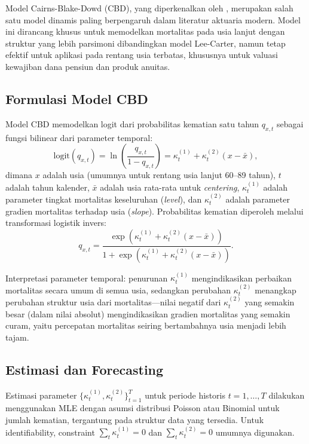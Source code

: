 Model Cairns-Blake-Dowd (CBD), yang diperkenalkan oleh \citet{cairns2006two}, merupakan salah satu model dinamis paling berpengaruh dalam literatur aktuaria modern. Model ini dirancang khusus untuk memodelkan mortalitas pada usia lanjut dengan struktur yang lebih parsimoni dibandingkan model Lee-Carter, namun tetap efektif untuk aplikasi pada rentang usia terbatas, khususnya untuk valuasi kewajiban dana pensiun dan produk anuitas.

\subsection{Formulasi Model CBD}

Model CBD memodelkan logit dari probabilitas kematian satu tahun $q_{x,t}$ sebagai fungsi bilinear dari parameter temporal:
\begin{equation}
\text{logit}(q_{x,t}) = \ln\left(\frac{q_{x,t}}{1-q_{x,t}}\right) = \kappa_t^{(1)} + \kappa_t^{(2)} (x - \bar{x}),
\label{eq:cbd_basic}
\end{equation}
dimana $x$ adalah usia (umumnya untuk rentang usia lanjut 60--89 tahun), $t$ adalah tahun kalender, $\bar{x}$ adalah usia rata-rata untuk \textit{centering}, $\kappa_t^{(1)}$ adalah parameter tingkat mortalitas keseluruhan (\textit{level}), dan $\kappa_t^{(2)}$ adalah parameter gradien mortalitas terhadap usia (\textit{slope}). Probabilitas kematian diperoleh melalui transformasi logistik invers:
\begin{equation}
q_{x,t} = \frac{\exp(\kappa_t^{(1)} + \kappa_t^{(2)} (x - \bar{x}))}{1 + \exp(\kappa_t^{(1)} + \kappa_t^{(2)} (x - \bar{x}))}.
\label{eq:cbd_qx}
\end{equation}

Interpretasi parameter temporal: penurunan $\kappa_t^{(1)}$ mengindikasikan perbaikan mortalitas secara umum di semua usia, sedangkan perubahan $\kappa_t^{(2)}$ menangkap perubahan struktur usia dari mortalitas—nilai negatif dari $\kappa_t^{(2)}$ yang semakin besar (dalam nilai absolut) mengindikasikan gradien mortalitas yang semakin curam, yaitu percepatan mortalitas seiring bertambahnya usia menjadi lebih tajam.

\subsection{Estimasi dan Forecasting}

Estimasi parameter $\{\kappa_t^{(1)}, \kappa_t^{(2)}\}_{t=1}^T$ untuk periode historis $t = 1, \ldots, T$ dilakukan menggunakan MLE dengan asumsi distribusi Poisson atau Binomial untuk jumlah kematian, tergantung pada struktur data yang tersedia. Untuk identifiability, constraint $\sum_t \kappa_t^{(1)} = 0$ dan $\sum_t \kappa_t^{(2)} = 0$ umumnya digunakan.


